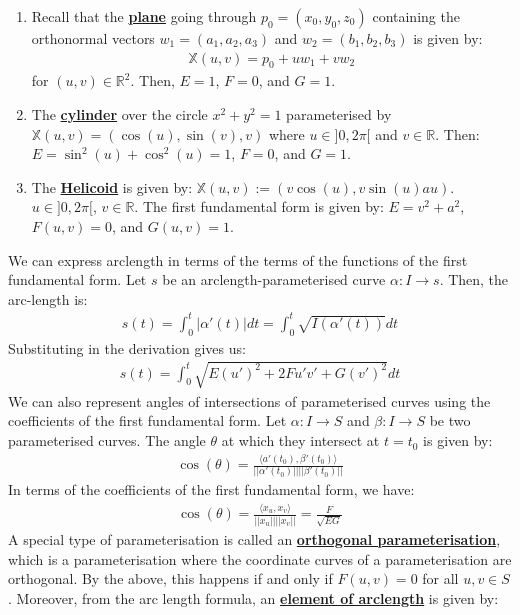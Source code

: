 \documentclass[11pt]{scrartcl}
\newcommand{\R}[0]{\mathbb{R}}
\theoremstyle{definition}
\theoremstyle{remark}
\newcommand{\dfn}[1]{\textbf{\underline{#1}}}
\newcommand{\idx}[2]{\int_{#1}^{#2}}
\begin{document}
{\begin{enumerate}[noitemsep]
	\item Recall that the \dfn{plane} going through $p_0 = (x_0, y_0, z_0)$ containing the orthonormal vectors $w_1 = (a_1, a_2, a_3)$ and $w_2 = (b_1, b_2, b_3)$ is given by: 
	 \begin{align*}
		\mathbb{X}(u,v)  = p_0 + uw_1 + vw_2 
	\end{align*}
	for $(u,v) \in \R^2$. Then, $E = 1$, $F=0$, and $G=1$. 
	\item The \dfn{cylinder} over the circle $x^2 + y^2 = 1$ parameterised by $\mathbb{X} (u,v) = (\cos (u) , \sin(v), v) $ where $u \in ]0, 2 \pi[$ and $v \in \R$. Then: $E = \sin^2 (u) + \cos^2(u) =1$, $F =0$, and $G=1$. 
	\item The \dfn{Helicoid} is given by: $\mathbb{X}(u,v) := (v \cos (u), v \sin(u) au)$. $ u \in ]0, 2 \pi[$, $v \in \R$. The first fundamental form is given by: $ E = v^2 + a^2$, $F(u,v) = 0$, and $G(u,v) = 1$. 
\end{enumerate}
We can express arclength in terms of the terms of the functions of the first fundamental form. Let $s$ be an arclength-parameterised curve $\alpha: I \rightarrow s$. Then, the arc-length is: 
\begin{align*}
	s(t) = \idx{0}{t} | \alpha'(t) | dt = \idx{0}{t} \sqrt{I(\alpha'(t))} dt
\end{align*}
Substituting in the derivation gives us: 
\begin{align*}
	s(t) = \idx{0}{t} \sqrt{E(u')^2  + 2Fu' v' + G(v')^2} dt 
\end{align*}
We can also represent angles of intersections of parameterised curves using the coefficients of the first fundamental form. Let $\alpha: I \rightarrow S$ and $\beta: I \rightarrow S$ be two parameterised curves. The angle $\theta$ at which they intersect at $t=t_0$ is given by: 
\begin{align} 
\cos(\theta) = \frac{\langle a'(t_0), \beta'(t_0) \rangle}{|| \alpha'(t_0) || || \beta'(t_0) ||}
\end{align} 
In terms of the coefficients of the first fundamental form, we have: 
\begin{align*}
	\cos(\theta) = \frac{\langle x_u, x_v \rangle}{||x_u|| ||x_v || } = \frac{F}{\sqrt{EG}}
\end{align*}
A special type of parameterisation is called an \dfn{orthogonal parameterisation}, which is a parameterisation where the coordinate curves of a parameterisation are orthogonal. By the above, this happens if and only if $F(u,v) = 0$ for all $u,v \in S$. Moreover, from the arc length formula, an \dfn{element of arclength} is given by: 
}
\end{document}
